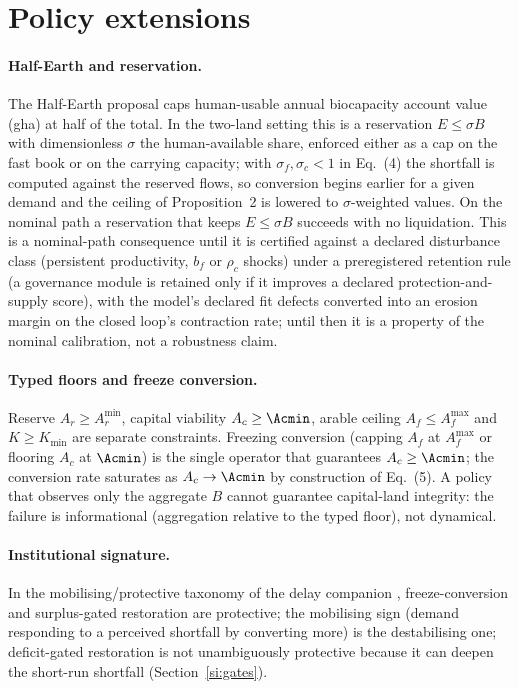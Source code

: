 \section{Policy extensions}\label{si:policy}

\paragraph{Half-Earth and reservation.} The Half-Earth proposal \citep{Wilson2016} caps human-usable annual biocapacity account value (gha) at half of the total. In the two-land setting this is a reservation $E\le\sigma B$ with dimensionless $\sigma$ the human-available share, enforced either as a cap on the fast book or on the carrying capacity; with $\sigma_f,\sigma_c<1$ in Eq.~(4) the shortfall is computed against the reserved flows, so conversion begins earlier for a given demand and the ceiling of Proposition~2 is lowered to $\sigma$-weighted values. On the nominal path a reservation that keeps $E\le\sigma B$ succeeds with no liquidation. This is a nominal-path consequence until it is certified against a declared disturbance class (persistent productivity, $b_f$ or $\rho_c$ shocks) under a preregistered retention rule (a governance module is retained only if it improves a declared protection-and-supply score), with the model's declared fit defects converted into an erosion margin on the closed loop's contraction rate; until then it is a property of the nominal calibration, not a robustness claim.

\paragraph{Typed floors and freeze conversion.} Reserve $A_r\ge A_r^{\min}$, capital viability $A_c\ge\Acmin$, arable ceiling $A_f\le A_f^{\max}$ and $K\ge K_{\min}$ are separate constraints. Freezing conversion (capping $A_f$ at $A_f^{\max}$ or flooring $A_c$ at $\Acmin$) is the single operator that guarantees $A_c\ge\Acmin$; the conversion rate saturates as $A_c\to\Acmin$ by construction of Eq.~(5). A policy that observes only the aggregate $B$ cannot guarantee capital-land integrity: the failure is informational (aggregation relative to the typed floor), not dynamical.

\paragraph{Institutional signature.} In the mobilising/protective taxonomy of the delay companion \citep{Abaee2026a}, freeze-conversion and surplus-gated restoration are protective; the mobilising sign (demand responding to a perceived shortfall by converting more) is the destabilising one; deficit-gated restoration is not unambiguously protective because it can deepen the short-run shortfall (Section~\ref{si:gates}).

